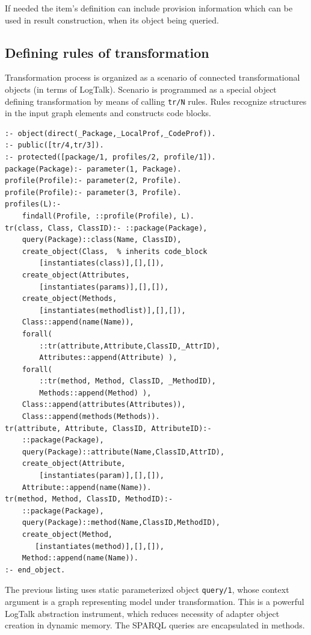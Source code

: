 \documentclass[conference]{IEEEtran}
\begin{document}
If needed the item's definition can include provision information which can be used in result construction, when its object being queried.

\subsection{Defining rules of transformation}
\label{sec:mda-rules}

Transformation process is organized as a scenario of connected transformational objects (in terms of LogTalk).  Scenario is programmed as a special object defining transformation by means of calling \verb|tr/N| rules.  Rules recognize structures in the input graph elements and constructs code blocks.

\begin{verbatim}
:- object(direct(_Package,_LocalProf,_CodeProf)).
:- public([tr/4,tr/3]).
:- protected([package/1, profiles/2, profile/1]).
package(Package):- parameter(1, Package).
profile(Profile):- parameter(2, Profile).
profile(Profile):- parameter(3, Profile).
profiles(L):-
    findall(Profile, ::profile(Profile), L).
tr(class, Class, ClassID):- ::package(Package),
    query(Package)::class(Name, ClassID),
    create_object(Class,  % inherits code_block
        [instantiates(class)],[],[]),
    create_object(Attributes,
        [instantiates(params)],[],[]),
    create_object(Methods,
        [instantiates(methodlist)],[],[]),
    Class::append(name(Name)),
    forall(
        ::tr(attribute,Attribute,ClassID,_AttrID),
        Attributes::append(Attribute) ),
    forall(
        ::tr(method, Method, ClassID, _MethodID),
        Methods::append(Method) ),
    Class::append(attributes(Attributes)),
    Class::append(methods(Methods)).
tr(attribute, Attribute, ClassID, AttributeID):-
    ::package(Package),
    query(Package)::attribute(Name,ClassID,AttrID),
    create_object(Attribute,
        [instantiates(param)],[],[]),
    Attribute::append(name(Name)).
tr(method, Method, ClassID, MethodID):-
    ::package(Package),
    query(Package)::method(Name,ClassID,MethodID),
    create_object(Method,
       [instantiates(method)],[],[]),
    Method::append(name(Name)).
:- end_object.
\end{verbatim}

The previous listing uses static parameterized object \verb|query/1|, whose context argument is a graph representing model under transformation.  This is a powerful LogTalk abstraction instrument, which reduces necessity of adapter object creation in dynamic memory.  The SPARQL queries are encapsulated in methods.
\end{document}
